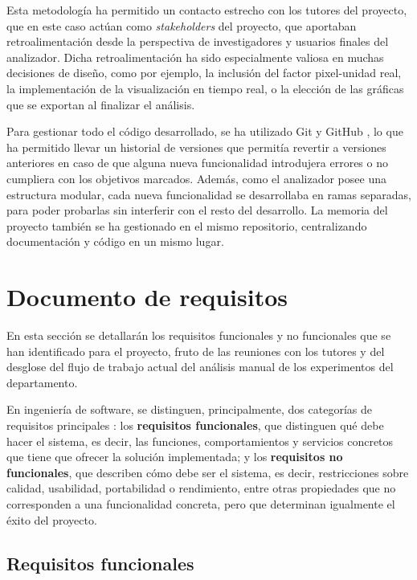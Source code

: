 Esta metodología ha permitido un contacto estrecho con los tutores del proyecto, que en este caso actúan como \textit{stakeholders} del proyecto, que aportaban retroalimentación desde la perspectiva de investigadores y usuarios finales del analizador. Dicha retroalimentación ha sido especialmente valiosa en muchas decisiones de diseño, como por ejemplo, la inclusión del factor pixel-unidad real, la implementación de la visualización en tiempo real, o la elección de las gráficas que se exportan al finalizar el análisis.

Para gestionar todo el código desarrollado, se ha utilizado Git y GitHub \cite{git_software} \cite{github_platform}, lo que ha permitido llevar un historial de versiones que permitía revertir a versiones anteriores en caso de que alguna nueva funcionalidad introdujera errores o no cumpliera con los objetivos marcados. Además, como el analizador posee una estructura modular, cada nueva funcionalidad se desarrollaba en ramas separadas, para poder probarlas sin interferir con el resto del desarrollo. La memoria del proyecto también se ha gestionado en el mismo repositorio, centralizando documentación y código en un mismo lugar.

\section{Documento de requisitos}

En esta sección se detallarán los requisitos funcionales y no funcionales que se han identificado para el proyecto, fruto de las reuniones con los tutores y del desglose del flujo de trabajo actual del análisis manual de los experimentos del departamento.

En ingeniería de software, se distinguen, principalmente, dos categorías de requisitos principales \cite{sommerville2016}: los \textbf{requisitos funcionales}, que distinguen qué debe hacer el sistema, es decir, las funciones, comportamientos y servicios concretos que tiene que ofrecer la solución implementada; y los \textbf{requisitos no funcionales}, que describen cómo debe ser el sistema, es decir, restricciones sobre calidad, usabilidad, portabilidad o rendimiento, entre otras propiedades que no corresponden a una funcionalidad concreta, pero que determinan igualmente el éxito del proyecto.

\subsection{Requisitos funcionales}

